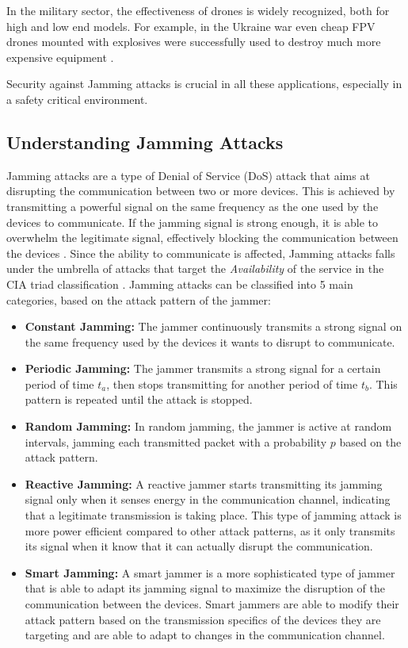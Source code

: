 \documentclass[futureinternet,article,submit,pdftex,moreauthors]{Definitions/mdpi}
\begin{document}
In the military sector, the effectiveness of drones is widely recognized, both for high and low end models. For example, in the Ukraine war even cheap FPV drones 
mounted with explosives were successfully used to destroy much more expensive equipment \cite{DroneCombatUkraine}. 

Security against Jamming attacks is crucial in all these applications, especially in a safety critical environment. 

\subsection{Understanding Jamming Attacks}

Jamming attacks are a type of Denial of Service (DoS) attack that aims at disrupting the communication between two or more devices. 
This is achieved by transmitting a powerful signal on the same frequency as the one used by the devices to communicate. If the jamming signal is strong enough, 
it is able to overwhelm the legitimate signal, effectively blocking the communication between the devices \cite{DroneCommHassija}. 
Since the ability to communicate is affected, Jamming attacks falls under the umbrella of attacks that target the \textit{Availability} of the service in the CIA triad classification \cite{DataIntegrityCawthra}. 
Jamming attacks can be classified into 5 main categories, based on the attack pattern of the jammer: 

\begin{itemize}
    \item \textbf{Constant Jamming:} The jammer continuously transmits a strong signal on the same frequency used by the devices it wants to disrupt to communicate. 
    \item \textbf{Periodic Jamming:} The jammer transmits a strong signal for a certain period of time \(t_a\), then stops transmitting for another period of time \(t_b\). This pattern is repeated until the attack is stopped.
    \item \textbf{Random Jamming:} In random jamming, the jammer is active at random intervals, jamming each transmitted packet with a probability 
    \(p\) based on the attack pattern\cite{VANETsAI-Lyamin}. 
    \item \textbf{Reactive Jamming:} A reactive jammer starts transmitting its jamming signal only when it senses energy in the communication channel, 
    indicating that a legitimate transmission is taking place. This type of jamming attack is more power efficient compared to other 
    attack patterns, as it only transmits its signal when it know that it can actually disrupt the communication\cite{MLMisbehavior5GBoualouache}.
    \item \textbf{Smart Jamming:} A smart jammer is a more sophisticated type of jammer that is able to adapt its jamming signal to 
    maximize the disruption of the communication between the devices. Smart jammers are able to modify their attack pattern based on the 
    transmission specifics of the devices they are targeting and are able to adapt to changes in the communication channel\cite{AntiJammingV2V-Feng}.
\end{itemize}
\end{document}
